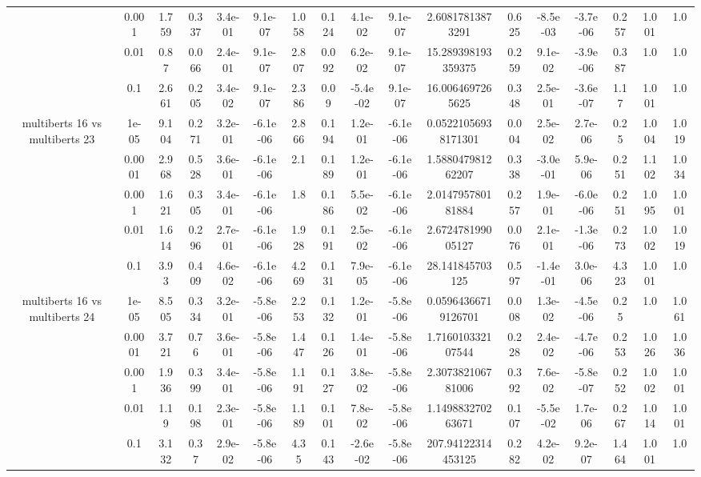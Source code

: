 \begin{tabular}{|c|c|c|c|c|c|c|c|c|c|c|c|c|c|c|c|c|}
 & 0.001 & 1.759 & 0.337 & 3.4e-01 & 9.1e-07 & 1.058 & 0.124 & 4.1e-02 & 9.1e-07 & 2.60817813873291 & 0.625 & -8.5e-03 & -3.7e-06 & 0.257 & 1.001 & 1.0 \\
 & 0.01 & 0.87 & 0.066 & 2.4e-01 & 9.1e-07 & 2.807 & 0.092 & 6.2e-02 & 9.1e-07 & 15.289398193359375 & 0.259 & 9.1e-02 & -3.9e-06 & 0.387 & 1.0 & 1.0 \\
 & 0.1 & 2.661 & 0.205 & 3.4e-02 & 9.1e-07 & 2.386 & 0.09 & -5.4e-02 & 9.1e-07 & 16.0064697265625 & 0.348 & 2.5e-01 & -3.6e-07 & 1.17 & 1.001 & 1.0 \\
\hline
\multirow{5}{*}{multiberts 16 vs multiberts 23} & 1e-05 & 9.104 & 0.271 & 3.2e-01 & -6.1e-06 & 2.866 & 0.194 & 1.2e-01 & -6.1e-06 & 0.05221056938171301 & 0.004 & 2.5e-02 & 2.7e-06 & 0.25 & 1.004 & 1.019 \\
 & 0.0001 & 2.968 & 0.528 & 3.6e-01 & -6.1e-06 & 2.1 & 0.189 & 1.2e-01 & -6.1e-06 & 1.588047981262207 & 0.338 & -3.0e-01 & 5.9e-06 & 0.251 & 1.102 & 1.034 \\
 & 0.001 & 1.621 & 0.305 & 3.4e-01 & -6.1e-06 & 1.8 & 0.186 & 5.5e-02 & -6.1e-06 & 2.014795780181884 & 0.257 & 1.9e-01 & -6.0e-06 & 0.251 & 1.095 & 1.001 \\
 & 0.01 & 1.614 & 0.296 & 2.7e-01 & -6.1e-06 & 1.928 & 0.191 & 2.5e-02 & -6.1e-06 & 2.672478199005127 & 0.076 & 2.1e-01 & -1.3e-06 & 0.273 & 1.002 & 1.019 \\
 & 0.1 & 3.93 & 0.409 & 4.6e-02 & -6.1e-06 & 4.269 & 0.131 & 7.9e-05 & -6.1e-06 & 28.141845703125 & 0.597 & -1.4e-01 & 3.0e-06 & 4.323 & 1.001 & 1.0 \\
\hline
\multirow{5}{*}{multiberts 16 vs multiberts 24} & 1e-05 & 8.505 & 0.334 & 3.2e-01 & -5.8e-06 & 2.253 & 0.132 & 1.2e-01 & -5.8e-06 & 0.05964366719126701 & 0.008 & 1.3e-02 & -4.5e-06 & 0.25 & 1.0 & 1.061 \\
 & 0.0001 & 3.721 & 0.76 & 3.6e-01 & -5.8e-06 & 1.447 & 0.126 & 1.4e-01 & -5.8e-06 & 1.716010332107544 & 0.228 & 2.4e-02 & -4.7e-06 & 0.253 & 1.026 & 1.036 \\
 & 0.001 & 1.936 & 0.399 & 3.4e-01 & -5.8e-06 & 1.191 & 0.127 & 3.8e-02 & -5.8e-06 & 2.307382106781006 & 0.392 & 7.6e-02 & -5.8e-07 & 0.252 & 1.002 & 1.001 \\
 & 0.01 & 1.19 & 0.198 & 2.3e-01 & -5.8e-06 & 1.189 & 0.101 & 7.8e-02 & -5.8e-06 & 1.149883270263671 & 0.107 & -5.5e-02 & 1.7e-06 & 0.267 & 1.014 & 1.001 \\
 & 0.1 & 3.132 & 0.37 & 2.9e-02 & -5.8e-06 & 4.35 & 0.143 & -2.6e-02 & -5.8e-06 & 207.94122314453125 & 0.282 & 4.2e-02 & 9.2e-07 & 1.464 & 1.001 & 1.0 \\

\end{tabular}
